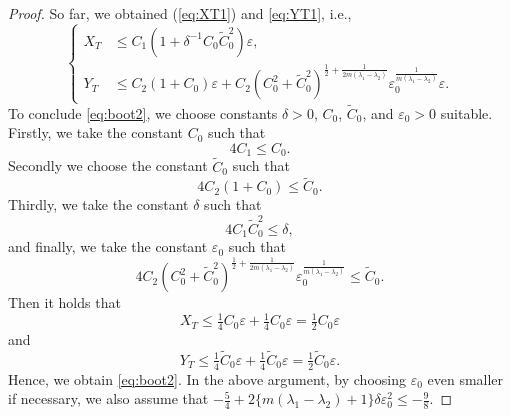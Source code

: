 \documentclass[11pt,a4paper,twosides]{amsart}
\theoremstyle{plain}
\theoremstyle{remark}
\numberwithin{equation}{section}
\def\le{\leqslant}
\theoremstyle{definition}
\newcommand{\1}{{\bf 1}_{\{|x| < |t|\}}}
\renewcommand{\epsilon}{\varepsilon}
\renewcommand{\tilde}{\widetilde}
\begin{document}
\begin{proof}
So far, we obtained (\ref{eq:XT1}) and \eqref{eq:YT1}, i.e.,
\begin{equation*}
    \left\{
    \begin{aligned}
      X_T & \le C_1(1+\delta^{-1}C_0\widetilde{C}_0^2)\epsilon, \\
      Y_T & \le C_2(1+C_0)\epsilon
      + C_2(C_0^2 + \tilde{C}_0^2)^{\frac{1}{2}+\frac{1}{2m(\lambda_1-\lambda_2)}}\epsilon_0^{\frac{1}{m(\lambda_1-\lambda_2)}}\epsilon.
    \end{aligned}
    \right.
 \end{equation*}
To conclude \eqref{eq:boot2}, we choose constants $\delta > 0$, $C_0$, $\tilde{C}_0$, and $\epsilon_0 > 0$ suitable.
  Firstly, we take the constant $C_0$ such that
  \begin{equation}\nonumber
    4C_1 \le C_0.
  \end{equation}
  Secondly  we choose the constant $\tilde{C}_0$ such that
  \begin{equation}\nonumber
    4C_2(1+C_0) \le \tilde{C}_0.
  \end{equation}
  Thirdly, we take the constant $\delta$ such that
  \begin{equation}\nonumber
    4C_1\tilde{C}_0^2 \le \delta,
  \end{equation}
  and finally, we take the constant $\epsilon_0$ such that
  \begin{equation}\nonumber
    4C_2(C_0^2 + \tilde{C}_0^2)^{\frac{1}{2}+\frac{1}{2m(\lambda_1-\lambda_2)}}\epsilon_0^{\frac{1}{m(\lambda_1-\lambda_2)}}
    \le \tilde{C}_0.
  \end{equation}
  Then it holds that
  \begin{equation}\nonumber
    X_T \le \tfrac14C_0\epsilon + \tfrac14C_0\epsilon = \tfrac12C_0\epsilon
  \end{equation}
  and
  \begin{equation}\nonumber
    Y_T \le \tfrac14\tilde{C}_0\epsilon + \tfrac14\tilde{C}_0\epsilon = \tfrac12 \tilde{C}_0\epsilon.
  \end{equation}
  Hence, we obtain \eqref{eq:boot2}.
  In the above argument, by choosing $\epsilon_0$ even smaller if necessary, we also assume that
  $-\frac{5}{4}+2\{m(\lambda_1-\lambda_2)+1\}\delta\epsilon_0^2 \le -\frac98$.


\end{proof}
\end{document}
